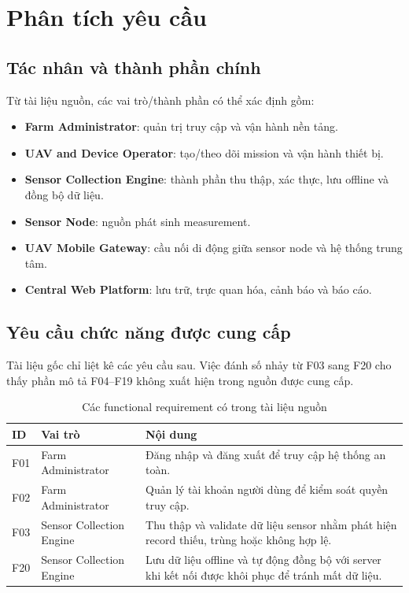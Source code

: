 
\chapter{Phân tích yêu cầu}

\section{Tác nhân và thành phần chính}
Từ tài liệu nguồn, các vai trò/thành phần có thể xác định gồm:
\begin{itemize}
  \item \textbf{Farm Administrator}: quản trị truy cập và vận hành nền tảng.
  \item \textbf{UAV and Device Operator}: tạo/theo dõi mission và vận hành thiết bị.
  \item \textbf{Sensor Collection Engine}: thành phần thu thập, xác thực, lưu offline và đồng bộ dữ liệu.
  \item \textbf{Sensor Node}: nguồn phát sinh measurement.
  \item \textbf{UAV Mobile Gateway}: cầu nối di động giữa sensor node và hệ thống trung tâm.
  \item \textbf{Central Web Platform}: lưu trữ, trực quan hóa, cảnh báo và báo cáo.
\end{itemize}

\section{Yêu cầu chức năng được cung cấp}
Tài liệu gốc chỉ liệt kê các yêu cầu sau. Việc đánh số nhảy từ F03 sang F20 cho thấy phần mô tả F04--F19 không xuất hiện trong nguồn được cung cấp.

\begin{longtable}{p{1.5cm}p{3.2cm}p{9cm}}
\caption{Các functional requirement có trong tài liệu nguồn}\label{tab:fr}\\
\toprule
ID & Vai trò & Nội dung \\
\midrule
F01 & Farm Administrator & Đăng nhập và đăng xuất để truy cập hệ thống an toàn.\\
F02 & Farm Administrator & Quản lý tài khoản người dùng để kiểm soát quyền truy cập.\\
F03 & Sensor Collection Engine & Thu thập và validate dữ liệu sensor nhằm phát hiện record thiếu, trùng hoặc không hợp lệ.\\
F20 & Sensor Collection Engine & Lưu dữ liệu offline và tự động đồng bộ với server khi kết nối được khôi phục để tránh mất dữ liệu.\\
\bottomrule
\end{longtable}

